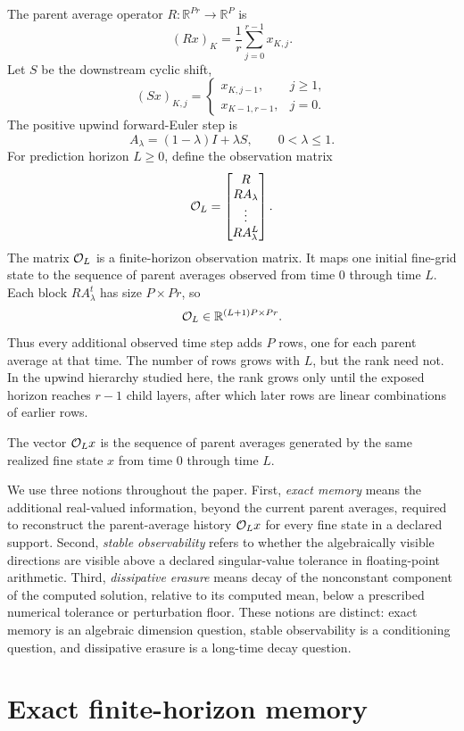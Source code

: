 \documentclass[preprint,12pt]{elsarticle}
\theoremstyle{plain}
\theoremstyle{remark}
\theoremstyle{definition}
\newcommand{\R}{\mathbb R}
\begin{document}
The parent average operator \(R:\R^{Pr}\to\R^P\) is
\[
  (Rx)_K=\frac1r\sum_{j=0}^{r-1}x_{K,j}.
\]
Let \(S\) be the downstream cyclic shift,
\[
 (Sx)_{K,j}
 =
 \begin{cases}
   x_{K,j-1}, & j\ge1,\\
   x_{K-1,r-1}, & j=0.
 \end{cases}
\]
The positive upwind forward-Euler step is
\[
  A_\lambda=(1-\lambda)I+\lambda S,
  \qquad
  0<\lambda\le1.
\]
For prediction horizon \(L\ge0\), define the observation matrix
\[
  {\cal O}_L =
  \begin{bmatrix}
  R\\
  RA_\lambda\\
  \vdots\\
  RA_\lambda^L
  \end{bmatrix}.
\]
The matrix \({\cal O}_L\) is a finite-horizon observation matrix.  It maps
one initial fine-grid state to the sequence of parent averages observed from
time \(0\) through time \(L\).  Each block \(RA_\lambda^t\) has size
\(P\times Pr\), so
\[
  {\cal O}_L\in\mathbb R^{(L+1)P\times Pr}.
\]
Thus every additional observed time step adds \(P\) rows, one for each
parent average at that time.  The number of rows grows with \(L\), but the
rank need not.  In the upwind hierarchy studied here, the rank grows only
until the exposed horizon reaches \(r-1\) child layers, after which later
rows are linear combinations of earlier rows.

The vector \({\cal O}_Lx\) is the sequence of parent averages generated by
the same realized fine state \(x\) from time \(0\) through time \(L\).

We use three notions throughout the paper.  First, \emph{exact memory}
means the additional real-valued information, beyond the current parent
averages, required to reconstruct the parent-average history
\({\cal O}_Lx\) for every fine state in a declared support.  Second,
\emph{stable observability} refers to whether the algebraically visible
directions are visible above a declared singular-value tolerance in
floating-point arithmetic.  Third, \emph{dissipative erasure} means decay of
the nonconstant component of the computed solution, relative to its computed
mean, below a prescribed numerical tolerance or perturbation floor.  These
notions are distinct: exact memory is an algebraic dimension question,
stable observability is a conditioning question, and dissipative erasure is
a long-time decay question.

\section{Exact finite-horizon memory} \label{sec:exact_fh}
\end{document}

